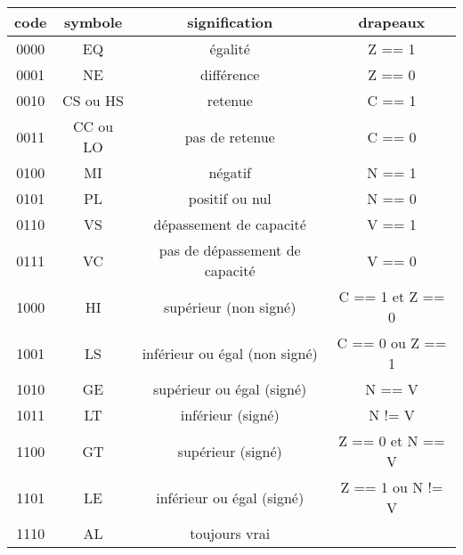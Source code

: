 \documentclass{article}
\begin{document}
    \begin{tabular}{| c | c | c | c |}
        \hline
        \textbf{code} & \textbf{symbole} & \textbf{signification}         & \textbf{drapeaux} \\
        \hline
        0000          & EQ               & égalité                        & Z == 1            \\
        \hline
        0001          & NE               & différence                     & Z == 0            \\
        \hline
        0010          & CS ou HS         & retenue                        & C == 1            \\
        \hline
        0011          & CC ou LO         & pas de retenue                 & C == 0            \\
        \hline
        0100          & MI               & négatif                        & N == 1            \\
        \hline
        0101          & PL               & positif ou nul                 & N == 0            \\
        \hline
        0110          & VS               & dépassement de capacité        & V == 1            \\
        \hline
        0111          & VC               & pas de dépassement de capacité & V == 0            \\
        \hline
        1000          & HI               & supérieur (non signé)          & C == 1 et Z == 0  \\
        \hline
        1001          & LS               & inférieur ou égal (non signé)  & C == 0 ou Z == 1  \\
        \hline
        1010          & GE               & supérieur ou égal (signé)      & N == V            \\
        \hline
        1011          & LT               & inférieur (signé)              & N != V            \\
        \hline
        1100          & GT               & supérieur (signé)              & Z == 0 et N == V  \\
        \hline
        1101          & LE               & inférieur ou égal (signé)      & Z == 1 ou N != V  \\
        \hline
        1110          & AL             & toujours vrai                  &                   \\
        \hline
    \end{tabular}
\end{document}
